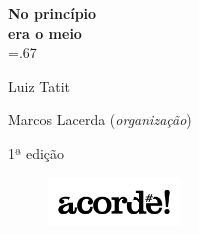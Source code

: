 




\begingroup\thispagestyle{empty}\vspace*{-.01\textheight}\parindent=0pt 
              \formular
              \huge 
              \textbf{No princípio\\era o meio}\\\baselineskip=.67\baselineskip 

              \medskip
              
              \LARGE
              Luiz Tatit
              
              \vspace{4cm}              

              \newfontfamily{}
              {\selectfont\minion\small Marcos Lacerda (\textit{organização})}
              
              \vspace{0.5cm}

              {\selectfont\minion\footnotesize
              1ª edição}
                    
              \vfill
              
              \begin{figure}
              \vspace*{-1.22\baselineskip}
              \includegraphics[width=3.5cm]{./logoacorde.png}
              \end{figure}

